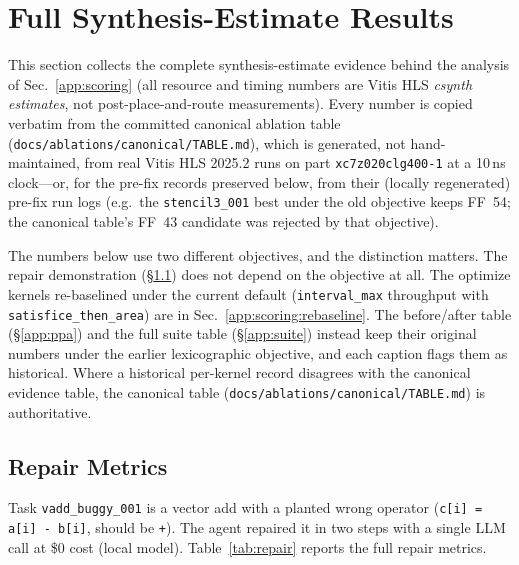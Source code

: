 \section{Full Synthesis-Estimate Results}\label{app:results}

This section collects the complete synthesis-estimate evidence behind the analysis of
Sec.~\ref{app:scoring} (all resource and timing numbers are Vitis HLS \emph{csynth
estimates}, not post-place-and-route measurements). Every number is copied verbatim from the
committed canonical ablation table (\texttt{docs/ablations/canonical/TABLE.md}),
which is generated, not hand-maintained, from real Vitis HLS 2025.2 runs on part
\texttt{xc7z020clg400-1} at a 10\,ns clock---or, for the pre-fix records
preserved below, from their (locally regenerated) pre-fix run logs (e.g.\ the \texttt{stencil3\_001}
best under the old objective keeps FF~54; the canonical table's FF~43 candidate
was rejected by that objective).

The numbers below use two different objectives, and the distinction matters. The
repair demonstration (\S\ref{app:repair}) does not depend on the objective at all.
The optimize kernels re-baselined under the current default (\texttt{interval\_max}
throughput with \texttt{satisfice\_then\_area}) are in Sec.~\ref{app:scoring:rebaseline}.
The before/after table (\S\ref{app:ppa}) and the full suite table
(\S\ref{app:suite}) instead keep their original numbers under the earlier lexicographic
objective, and each caption flags them as historical. Where a historical per-kernel
record disagrees with the canonical evidence table, the canonical table
(\texttt{docs/ablations/canonical/TABLE.md}) is authoritative.

\subsection{Repair Metrics}\label{app:repair}

Task \texttt{vadd\_buggy\_001} is a vector add with a planted wrong operator
(\texttt{c[i] = a[i] - b[i]}, should be \texttt{+}). The agent repaired it in two
steps with a single LLM call at \$0 cost (local model). Table~\ref{tab:repair}
reports the full repair metrics.

